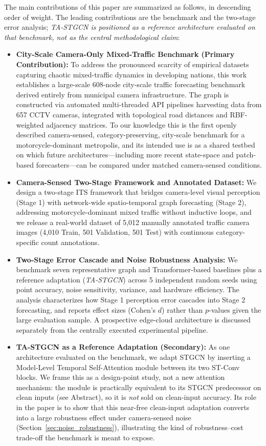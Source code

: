 \documentclass[a4paper,fleqn]{cas-sc}
\begin{document}
The main contributions of this paper are summarized as follows, in descending order of weight. The leading contributions are the benchmark and the two-stage error analysis; \emph{TA-STGCN is positioned as a reference architecture evaluated on that benchmark, not as the central methodological claim}:
\begin{itemize}
    \item \textbf{City-Scale Camera-Only Mixed-Traffic Benchmark (Primary Contribution):} To address the pronounced scarcity of empirical datasets capturing chaotic mixed-traffic dynamics in developing nations, this work establishes a large-scale 608-node city-scale traffic forecasting benchmark derived entirely from municipal camera infrastructure. The graph is constructed via automated multi-threaded API pipelines harvesting data from 657 CCTV cameras, integrated with topological road distances and RBF-weighted adjacency matrices. To our knowledge this is the first openly described camera-sensed, category-preserving, city-scale benchmark for a motorcycle-dominant metropolis, and its intended use is as a shared testbed on which future architectures---including more recent state-space and patch-based forecasters---can be compared under matched camera-sensed conditions.
    \item \textbf{Camera-Sensed Two-Stage Framework and Annotated Dataset:} We design a two-stage ITS framework that bridges camera-level visual perception (Stage 1) with network-wide spatio-temporal graph forecasting (Stage 2), addressing motorcycle-dominant mixed traffic without inductive loops, and we release a real-world dataset of 5,012 manually annotated traffic camera images (4,010 Train, 501 Validation, 501 Test) with continuous category-specific count annotations.
    \item \textbf{Two-Stage Error Cascade and Noise Robustness Analysis:} We benchmark seven representative graph and Transformer-based baselines plus a reference adaptation (\emph{TA-STGCN}) across 5 independent random seeds using point accuracy, noise sensitivity, variance, and hardware efficiency. The analysis characterizes how Stage 1 perception error cascades into Stage 2 forecasting, and reports effect sizes (Cohen's $d$) rather than $p$-values given the large evaluation sample. A prospective edge-cloud architecture is discussed separately from the centrally executed experimental pipeline.
    \item \textbf{TA-STGCN as a Reference Adaptation (Secondary):} As one architecture evaluated on the benchmark, we adapt STGCN \cite{stgcn} by inserting a Model-Level Temporal Self-Attention module \cite{attention} between its two ST-Conv blocks. We frame this as a design-point study, not a new attention mechanism: the module is practically equivalent to its STGCN predecessor on clean inputs (see Abstract), so it is \emph{not} sold on clean-input accuracy. Its role in the paper is to show that this near-free clean-input adaptation converts into a large robustness effect under camera-sensed noise (Section~\ref{sec:noise_robustness}), illustrating the kind of robustness--cost trade-off the benchmark is meant to expose.
\end{itemize}
\end{document}
